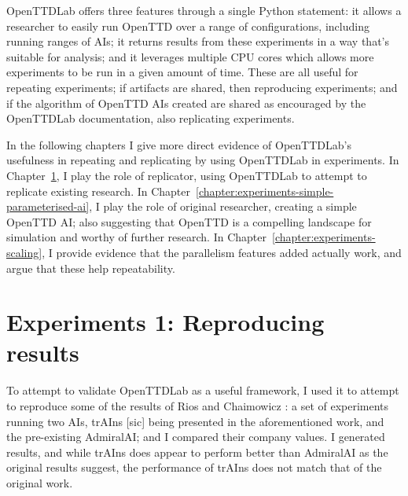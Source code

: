 \documentclass[logo,msc,dsti]{style/infthesis}    %
\begin{document}
{OpenTTDLab offers three features through a single Python statement: it allows a researcher to easily run OpenTTD over a range of configurations, including running ranges of AIs; it returns results from these experiments in a way that's suitable for analysis; and it leverages multiple CPU cores which allows more experiments to be run in a given amount of time. These are all useful for repeating experiments; if artifacts are shared, then reproducing experiments; and if the algorithm of OpenTTD AIs created are shared as encouraged by the OpenTTDLab documentation, also replicating experiments.

In the following chapters I give more direct evidence of OpenTTDLab's usefulness in repeating and replicating by using OpenTTDLab in experiments. In Chapter~\ref{chapter:experiments-attempt-at-reproducing}, I play the role of replicator, using OpenTTDLab to attempt to replicate existing research. In Chapter~\ref{chapter:experiments-simple-parameterised-ai}, I play the role of original researcher, creating a simple OpenTTD AI; also suggesting that OpenTTD is a compelling landscape for simulation and worthy of further research. In Chapter~\ref{chapter:experiments-scaling}, I provide evidence that the parallelism features added actually work, and argue that these help repeatability.



\chapter{Experiments 1: Reproducing results}
\label{chapter:experiments-attempt-at-reproducing}

To attempt to validate OpenTTDLab as a useful framework, I used it to attempt to reproduce some of the results of Rios and Chaimowicz \cite{rios2009trains}: a set of experiments running two AIs, trAIns [sic] being presented in the aforementioned work, and the pre-existing AdmiralAI; and I compared their company values. I generated results, and while trAIns does appear to perform better than AdmiralAI as the original results suggest, the performance of trAIns does not match that of the original work.

}
\end{document}
